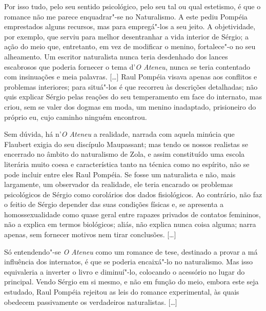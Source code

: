 

Por isso tudo, pelo seu sentido psicológico, pelo seu
tal ou qual estetismo, é que o romance não me parece enquadrar"-se no
Naturalismo. A este pediu Pompéia emprestados alguns recursos, mas para
empregá"-los a seu jeito. A objetividade, por exemplo, que serviu para
melhor desentranhar a vida interior de Sérgio; a ação do meio que,
entretanto, em vez de modificar o menino, fortalece"-o no seu
alheamento. Um escritor naturalista nunca teria desdenhado dos lances
escabrosos que poderia fornecer o tema d'\textit{O
Ateneu}, nunca se teria contentado com insinuações e
meia palavras. [\ldots] Raul Pompéia visava apenas aos conflitos e
problemas interiores; para situá"-los é que recorreu às descrições
detalhadas; não quis explicar Sérgio pelas reações do seu temperamento
em face do internato, mas criou, sem se valer dos dogmas em moda, um
menino inadaptado, prisioneiro do próprio eu, cujo caminho ninguém encontrou.

Sem dúvida, há n'\textit{O Ateneu} a realidade, narrada com aquela minúcia que
Flaubert exigia do seu discípulo Maupassant; mas tendo os nossos
realistas se encerrado no âmbito do naturalismo de Zola, e assim
constituído uma escola literária muito coesa e característica tanto na
técnica como no espírito, não se pode incluir entre eles Raul Pompéia.
Se fosse um naturalista e não, mais largamente, um observador da
realidade, ele teria encarado os problemas psicológicos de Sérgio como
corolários dos dados fisiológicos. Ao contrário, não faz o feitio de
Sérgio depender das suas condições físicas e, se apresenta a
homossexualidade como quase geral entre rapazes privados de contatos
femininos, não a explica em termos biológicos; aliás, não explica nunca
coisa alguma; narra apenas, sem fornecer motivos nem tirar conclusões.
[\ldots]

Só entendendo"-se \textit{O Ateneu} como um romance de tese, destinado a provar a
má influência dos internatos, é que se poderia encaixá"-lo no
naturalismo. Mas isso equivaleria a inverter o livro e diminuí"-lo,
colocando o acessório no lugar do principal. Vendo Sérgio em si mesmo,
e não em função do meio, embora este seja estudado, Raul Pompéia
rejeitou as leis do romance experimental, às quais obedecem
passivamente os verdadeiros naturalistas. [\ldots]

